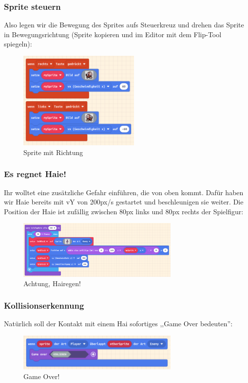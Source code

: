 \documentclass{beamer}
\begin{document}
\begin{frame}
 \frametitle{Sprite steuern}
 
 Also legen wir die Bewegung des Sprites aufs Steuerkreuz und drehen das Sprite in Bewegungsrichtung (Sprite kopieren und im Editor mit dem Flip-Tool spiegeln):
 
\begin{figure}
  \includegraphics[width=6cm]{game33.png}
  \caption{Sprite mit Richtung}
  \label{fig:game33}
\end{figure}
\end{frame}

\begin{frame}
 \frametitle{Es regnet Haie!}
 
Ihr wolltet eine zusätzliche Gefahr einführen, die von oben kommt. Dafür haben wir Haie bereits mit vY von 200px/s gestartet und beschleunigen sie weiter. Die Position der Haie ist zufällig zwischen 80px links und 80px rechts der Spielfigur:
 
\begin{figure}
  \includegraphics[width=8cm]{game34.png}
  \caption{Achtung, Hairegen!}
  \label{fig:game34}
\end{figure}
\end{frame}

\begin{frame}
 \frametitle{Kollisionserkennung}
 
Natürlich soll der Kontakt mit einem Hai sofortiges ,,Game Over bedeuten'':
 
\begin{figure}
  \includegraphics[width=8cm]{game35.png}
  \caption{Game Over!}
  \label{fig:game35}
\end{figure}
\end{frame}
\end{document}
